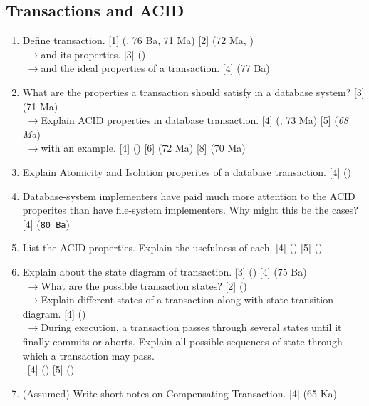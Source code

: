 \documentclass[12pt]{article}
\newcommand{\lb}{\\$\left|\rightarrow\right.$}
\newcommand{\enter}{\\\textcolor{white}{1}}
\begin{document}
    \subsection{Transactions and ACID}
            \begin{enumerate}[topsep=0pt]
                \item Define transaction. \hfill [1] (, 76 Ba, 71 Ma) [2] (72 Ma, )
                \lb and its properties. \hfill [3] ()
                \lb and the ideal properties of a transaction. \hfill [4] (77 Ba)

                \item What are the properties a transaction should satisfy in a database system? \hfill [3] (71 Ma)
                 \lb Explain ACID properties in database transaction. \hfill [4] (, 73 Ma) [5] (\textit{68 Ma})
            		\lb with an example. \hfill [4] () [6] (72 Ma) [8] (70 Ma)
            
            		\item Explain Atomicity and Isolation properites of a database transaction. \hfill [4] ()

            		\item Database-system implementers have paid much more attention to the ACID properites than have file-system implementers. Why might this be the cases? \hfill [4] (\texttt{80 Ba})

           		\item List the ACID properties. Explain the usefulness of each. \hfill [4] () [5] ()

                \item Explain about the state diagram of transaction. \hfill [3] () [4] (75 Ba)                
                \lb What are the possible transaction states? \hfill [2] ()
                \lb Explain different states of a transaction along with state transition diagram. \hfill [4] ()
                \lb During execution, a transaction passes through several states until it finally commits or aborts. Explain all possible sequences of state through which a transaction may pass.
                \enter\hfill [4] () [5] ()

                \item (Assumed) Write short notes on Compensating Transaction. \hfill [4] (65 Ka)
            \end{enumerate}
\end{document}
